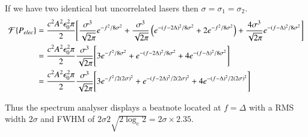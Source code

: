 If we have two identical but uncorrelated lasers then $\sigma=\sigma_1=\sigma_2$.
\begin{align}
\mathcal{F}\{P_{elec}\} &= \frac{c^2A^2\epsilon_0^2 \pi}{2}\Bigg[\frac{\sigma^3}{\sqrt{2\pi}} e^{-f^2/8\sigma^2} + \frac{\sigma^3}{\sqrt{2\pi}}\left(e^{-(f-2\Delta)^2/8\sigma^2} + 2e^{-f^2/8\sigma^2} \right) + \frac{4\sigma^3}{\sqrt{2\pi}}e^{-(f-\Delta)^2/8\sigma^2}\Bigg]\notag\\
&= \frac{c^2A^2\epsilon_0^2 \pi}{2}\frac{\sigma^3}{\sqrt{2\pi}}\Bigg[3e^{-f^2/8\sigma^2} + e^{-(f-2\Delta)^2/8\sigma^2} + 4e^{-(f-\Delta)^2/8\sigma^2}\Bigg]\notag\\
&= \frac{c^2A^2\epsilon_0^2 \pi}{2}\frac{\sigma^3}{\sqrt{2\pi}}\Bigg[3e^{-f^2/2(2\sigma)^2} + e^{-(f-2\Delta)^2/2(2\sigma)^2} + 4e^{-(f-\Delta)^2/2(2\sigma)^2}\Bigg]
\end{align}

Thus the spectrum analyser displays a beatnote located at $f=\Delta$ with a RMS width $2\sigma$ and FWHM of $2\sigma2\sqrt{2\log_e{2}}=2\sigma\times2.35$.
